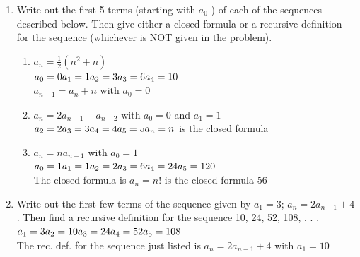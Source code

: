 \documentclass[11pt,a4paper]{article}
\newcommand\setItemNumber[1]{\setcounter{enumi}{\numexpr#1-1\relax}}
\begin{document}
\begin{enumerate}
            \item Write out the first 5 terms (starting with $a_0$ ) of each of the sequences described below. Then give either a closed formula or a recursive definition for the sequence (whichever is NOT given in the problem).
                \begin{enumerate}
                    \item $a_n = \frac{1}{2}(n^2 + n)$  \\
                        $a_0 = 0\\a_1 = 1\\a_2 = 3\\a_3 = 6\\a_4 = 10$\\
                        $a_{n+1} = a_n +n$ with $a_0 = 0$
                    \item $a_n = 2a_{n - 1} - a_{n - 2}$ with $a_0 = 0$ and $a_1 = 1$\\
                        $a_2 = 2\\a_3 = 3\\a_4 = 4\\a_5 = 5\\a_n = n$ is the closed formula
                    \item $a_n = na_{n - 1}$ with $a_0 = 1$\\
                        $a_0 = 1\\a_1 = 1\\a_2 = 2\\a_3 = 6\\a_4 = 24\\a_5 = 120$\\
                        The closed formula is $a_n = n!$ is the closed formula 56                 
                \end{enumerate}

            \setItemNumber{7}
            \item Write out the first few terms of the sequence given by $a_1 = 3$; $a_n = 2a_{n - 1} + 4$. Then find a recursive definition for the sequence 10, 24, 52, 108, . . .\\
                $a_1 = 3\\ a_2 = 10\\ a_3 = 24\\ a_4 = 52\\ a_5 = 108$\\ The rec. def. for the sequence just listed is $a_n = 2a_{n - 1} + 4$ with $a_1 = 10$



\end{enumerate}
\end{document}
